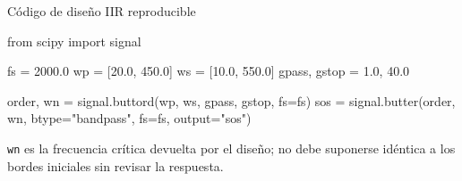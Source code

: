 \documentclass[
  ignorenonframetext,
  aspectratio=169,
  spanish,
  professionalfonts]{beamer}
\newenvironment{Shaded}{\begin{snugshade}}{\end{snugshade}}
\newcommand{\FloatTok}[1]{\textcolor[rgb]{0.68,0.00,0.00}{#1}}
\newcommand{\ImportTok}[1]{\textcolor[rgb]{0.00,0.46,0.62}{#1}}
\newcommand{\NormalTok}[1]{\textcolor[rgb]{0.00,0.23,0.31}{#1}}
\newcommand{\OperatorTok}[1]{\textcolor[rgb]{0.37,0.37,0.37}{#1}}
\newcommand{\StringTok}[1]{\textcolor[rgb]{0.13,0.47,0.30}{#1}}
\begin{document}
\begin{frame}[fragile]{Código de diseño IIR reproducible}
\protect{}\label{cuxf3digo-de-diseuxf1o-iir-reproducible}
\begin{Shaded}
\begin{Highlighting}[]
\ImportTok{from}\NormalTok{ scipy }\ImportTok{import}\NormalTok{ signal}

\NormalTok{fs }\OperatorTok{=} \FloatTok{2000.0}
\NormalTok{wp }\OperatorTok{=}\NormalTok{ [}\FloatTok{20.0}\NormalTok{, }\FloatTok{450.0}\NormalTok{]}
\NormalTok{ws }\OperatorTok{=}\NormalTok{ [}\FloatTok{10.0}\NormalTok{, }\FloatTok{550.0}\NormalTok{]}
\NormalTok{gpass, gstop }\OperatorTok{=} \FloatTok{1.0}\NormalTok{, }\FloatTok{40.0}

\NormalTok{order, wn }\OperatorTok{=}\NormalTok{ signal.buttord(wp, ws, gpass, gstop, fs}\OperatorTok{=}\NormalTok{fs)}
\NormalTok{sos }\OperatorTok{=}\NormalTok{ signal.butter(order, wn, btype}\OperatorTok{=}\StringTok{"bandpass"}\NormalTok{, fs}\OperatorTok{=}\NormalTok{fs,}
\NormalTok{                    output}\OperatorTok{=}\StringTok{"sos"}\NormalTok{)}
\end{Highlighting}
\end{Shaded}

\begin{tcolorbox}[enhanced jigsaw, arc=.35mm, bottomrule=.15mm, bottomtitle=1mm, breakable, colback=white, colbacktitle=quarto-callout-warning-color!10!white, colframe=quarto-callout-warning-color-frame, coltitle=black, left=2mm, leftrule=.75mm, opacityback=0, opacitybacktitle=0.6, rightrule=.15mm, title={Verificación necesaria}, titlerule=0mm, toprule=.15mm, toptitle=1mm]

\texttt{wn} es la frecuencia crítica devuelta por el diseño; no debe
suponerse idéntica a los bordes iniciales sin revisar la respuesta.

\end{tcolorbox}
\end{frame}
\end{document}
